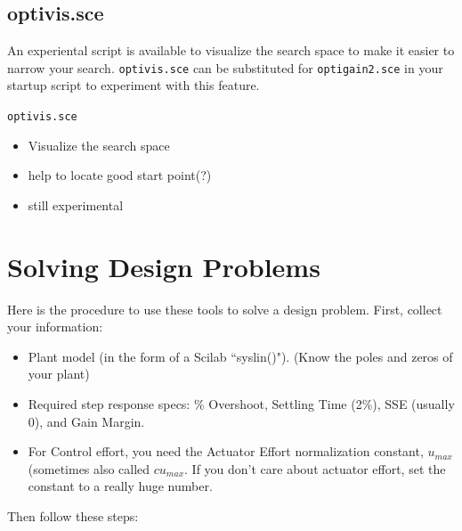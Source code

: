 



\subsection{optivis.sce}

An experiental script is available to visualize the search space to make it easier to narrow your search.  {\tt optivis.sce} can be substituted for {\tt optigain2.sce} in your startup script to experiment with this feature.	%

{\tt optivis.sce }

\begin{itemize}
    \item Visualize the search space
    \item help to locate good start point(?)
    \item still experimental
\end{itemize}



\section{Solving Design Problems}


Here is the procedure to use these tools to solve a design problem.
First, collect your information:
\begin{itemize}
  \item  Plant model (in the form of a Scilab ``syslin()"). (Know the poles and zeros of your plant)
  \item  Required step response specs:  \% Overshoot, Settling Time (2\%), SSE (usually 0), and Gain Margin.
  \item  For Control effort, you need the Actuator Effort normalization constant, $u_{max}$ (sometimes also called $cu_{max}$.   If you don't care about actuator effort, set the constant to a really huge number.
\end{itemize}

Then follow these steps:	%

